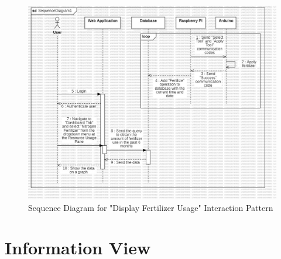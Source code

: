 \begin{figure}[htbp]
    \centering
    \includegraphics[width=1\linewidth]{Figures/sequence3.jpg}
    \caption{Sequence Diagram for "Display Fertilizer Usage" Interaction Pattern}
    \label{Sequence3}
\end{figure}
\newpage

\section{Information View}

